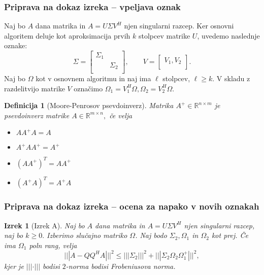 \documentclass{beamer}
\newtheorem{izrek}{Izrek}
\newtheorem{definicija}{Definicija}
\begin{document}
\begin{frame}
\frametitle{Priprava na dokaz izreka -- vpeljava oznak}
Naj bo $A$ dana matrika in $A = U \Sigma V^H$ njen singularni razcep. Ker osnovni algoritem deluje kot aproksimacija prvih $k$ stolpcev matrike $U$, uvedemo naslednje oznake:
$$ \Sigma = 
\begin{bmatrix}
\Sigma_1 & \\
& \Sigma_2 \\
\end{bmatrix}, \qquad
V = 
\begin{bmatrix}
V_1, V_2 \\
\end{bmatrix}.
$$ 
Naj bo $\Omega$ kot v osnovnem algoritmu in naj ima $\ell$ stolpcev, $\ell \geq k.$ V skladu z razdelitvijo matrike $V$ označimo $\Omega_1 = V_1^H\Omega, \Omega_2 = V_2^H\Omega.$
\pause
\begin{definicija}[Moore-Penrosov psevdoinverz]
Matrika $A^+ \in \mathbb{R}^{n\times m}$ je psevdoinverz matrike $A  \in \mathbb{R}^{m\times n},$ če velja
\begin{itemize}
\item $AA^+A = A$
\item $A^+AA^+ = A^+$
\item $(AA^+)^T = AA^+$
\item $(A^+A)^T = A^+A$
\end{itemize}
\end{definicija}
\end{frame}
\begin{frame}
\frametitle{Priprava na dokaz izreka -- ocena za napako v novih oznakah}
\begin{izrek}[Izrek A]
Naj bo $A$ dana matrika in $A = U \Sigma V^H$ njen singularni razcep, naj bo $k \geq 0.$ Izberimo slučajno matriko $\Omega$. Naj bodo $\Sigma_2, \Omega_1$ in $\Omega_2$ kot prej. Če ima $\Omega_1$ poln rang, velja $$|||A - QQ^HA|||^2 \leq |||\Sigma_2|||^2 + |||\Sigma_2 \Omega_2 \Omega_1^+|||^2,$$ kjer je $||| \cdot|||$ bodisi $2$-norma bodisi Frobeniusova norma.
\end{izrek}

\end{frame}
\end{document}
